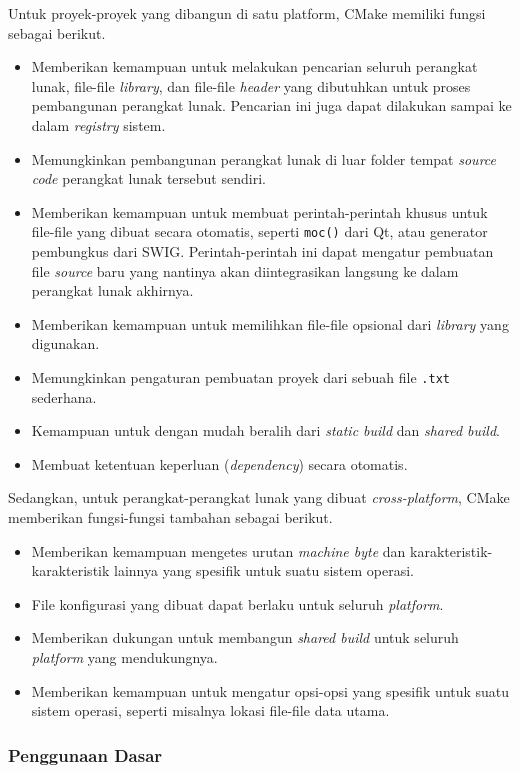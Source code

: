 Untuk proyek-proyek yang dibangun di satu platform, CMake memiliki fungsi sebagai berikut.

\begin{itemize}
	\item Memberikan kemampuan untuk melakukan pencarian seluruh perangkat lunak, file-file \textit{library}, dan file-file \textit{header} yang dibutuhkan untuk proses pembangunan perangkat lunak. Pencarian ini juga dapat dilakukan sampai ke dalam \textit{registry} sistem.
	\item Memungkinkan pembangunan perangkat lunak di luar folder tempat \textit{source code} perangkat lunak tersebut sendiri.
	\item Memberikan kemampuan untuk membuat perintah-perintah khusus untuk file-file yang dibuat secara otomatis, seperti \verb|moc()| dari Qt, atau generator pembungkus dari SWIG. Perintah-perintah ini dapat mengatur pembuatan file \textit{source} baru yang nantinya akan diintegrasikan langsung ke dalam perangkat lunak akhirnya.
	\item Memberikan kemampuan untuk memilihkan file-file opsional dari \textit{library} yang digunakan.
	\item Memungkinkan pengaturan pembuatan proyek dari sebuah file \verb|.txt| sederhana.
	\item Kemampuan untuk dengan mudah beralih dari \textit{static build} dan \textit{shared build}.
	\item Membuat ketentuan keperluan (\textit{dependency}) secara otomatis.
\end{itemize}
\noindent
Sedangkan, untuk perangkat-perangkat lunak yang dibuat \textit{cross-platform}, CMake memberikan fungsi-fungsi tambahan sebagai berikut.

\begin{itemize}
	\item Memberikan kemampuan mengetes urutan \textit{machine byte} dan karakteristik-karakteristik lainnya yang spesifik untuk suatu sistem operasi.
	\item File konfigurasi yang dibuat dapat berlaku untuk seluruh \textit{platform}.
	\item Memberikan dukungan untuk membangun \textit{shared build} untuk seluruh \textit{platform} yang mendukungnya.
	\item Memberikan kemampuan untuk mengatur opsi-opsi yang spesifik untuk suatu sistem operasi, seperti misalnya lokasi file-file data utama.
\end{itemize}

\subsubsection{Penggunaan Dasar}
\label{sec:cmodules-CMake-basicusage}

